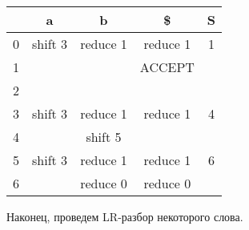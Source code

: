 \begin{example}
\begin{minipage}{0\linewidth}
\end{minipage}
\begin{minipage}{0.85\linewidth}
\begin{flushright}
\begin{tabular}{|c|c|c|c||c|} 
\hline
& a & b & \$ & S \\ [0.5ex] 
\hline
0 & shift 3 & reduce 1 & reduce 1 & 1 \\
\hline
1 & & & ACCEPT & \\
\hline
2 & & & & \\
\hline
3 & shift 3 & reduce 1 & reduce 1 & 4 \\
\hline
4 & & shift 5 & & \\
\hline
5 & shift 3 & reduce 1 & reduce 1 & 6 \\
\hline
6 & & reduce 0 & reduce 0 & \\ [1ex] 
\hline
\end{tabular}
\end{flushright}
\end{minipage}
\end{example}

Наконец, проведем LR-разбор некоторого слова.

